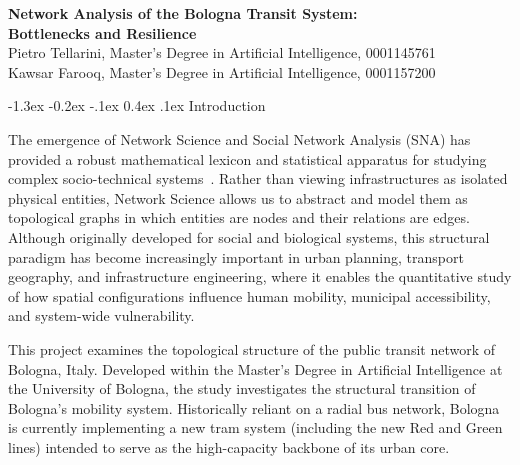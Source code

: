 \documentclass[12pt, a4paper]{article}
\makeatletter
\renewcommand\section{\@startsection {section}{1}{\z@}%
                                   {-1.3ex \@plus -0.2ex \@minus -.1ex}%
                                   {0.4ex \@plus.1ex}%
                                   {\normalfont\Large\bfseries}}
\makeatother
\begin{document}
\begin{center}
    \vspace*{-0.5cm}
    {\LARGE\bfseries Network Analysis of the Bologna Transit System:\\ Bottlenecks and Resilience} \\[0.3cm]
    {\large Pietro Tellarini, Master's Degree in Artificial Intelligence, 0001145761 \\ Kawsar Farooq, Master's Degree in Artificial Intelligence, 0001157200}
\end{center}
\vspace{0.2cm}

\section{Introduction}
\label{introduction}

The emergence of Network Science and Social Network Analysis (SNA) has provided a robust mathematical lexicon and statistical apparatus for studying complex socio-tech\-ni\-cal systems~\cite{newman}. Rather than viewing infrastructures as isolated physical entities, Network Science allows us to abstract and model them as topological graphs in which entities are nodes and their relations are edges. Although originally developed for social and biological systems, this structural paradigm has become increasingly important in urban planning, transport geography, and infrastructure engineering, where it enables the quantitative study of how spatial configurations influence human mobility, municipal accessibility, and system-wide vulnerability.

This project examines the topological structure of the public transit network of Bologna, Italy. Developed within the Master's Degree in Artificial Intelligence at the University of Bologna, the study investigates the structural transition of Bologna's mobility system. Historically reliant on a radial bus network, Bologna is currently implementing a new tram system (including the new Red and Green lines) intended to serve as the high-capacity backbone of its urban core.
\end{document}
